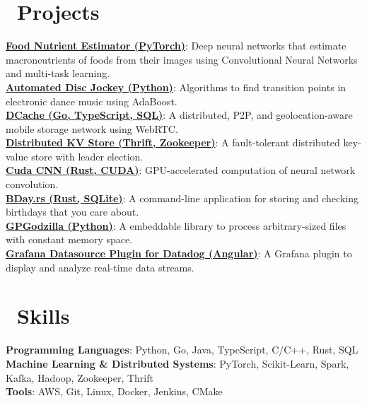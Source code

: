 \documentclass{resume}
\begin{document}
\section{\faCodeFork\ Projects}
 {

  \fontsize{10.5pt}{1.25}\selectfont
  \href{https://github.com/yirzhou/11785-Nutrient-Estimation}{\textbf{Food Nutrient Estimator (PyTorch)}}: Deep neural networks that estimate macroneutrients of foods from their images using Convolutional Neural Networks and multi-task learning. \\
  \href{https://github.com/pythonicmux/automated-dj-mlsp/tree/yirzhou}{\textbf{Automated Disc Jockey (Python)}}: Algorithms to find transition points in electronic dance music using AdaBoost. \\
  \href{https://drive.google.com/file/d/1Svd-wbXZiO84QmVKnKBp1cClJb2uvtWT/view?usp=sharing}{\textbf{DCache (Go, TypeScript, SQL)}}: A distributed, P2P, and geolocation-aware mobile storage network using WebRTC. \\
  \href{https://github.com/yirzhou/KVStore}{\textbf{Distributed KV Store (Thrift, Zookeeper)}}: A fault-tolerant distributed key-value store with leader election. \\
  \href{https://github.com/yirzhou/CudaCNN}{\textbf{Cuda CNN (Rust, CUDA)}}: GPU-accelerated computation of neural network convolution. \\
  \href{https://github.com/yirzhou/IsolatedSoul/tree/main/rsbday}{\textbf{BDay.rs (Rust, SQLite)}}: A command-line application for storing and checking birthdays that you care about. \\
  \href{https://pypi.org/project/gpgodzilla/}{\textbf{GPGodzilla (Python)}}: A embeddable library to process arbitrary-sized files with constant memory space. \\
  \href{https://github.com/Enflick/grafana-datasource-datadog/pull/7}{\textbf{Grafana Datasource Plugin for Datadog (Angular)}}: A Grafana plugin to display and analyze real-time data streams. \\
  \par
 }

\section{\faCogs\ Skills}
 {
  \fontsize{10.5pt}{2}\selectfont
  \onehalfspacing
  \textbf{Programming Languages}: Python, Go, Java, TypeScript, C/C++, Rust, SQL \\
  \textbf{Machine Learning \& Distributed Systems}: PyTorch, Scikit-Learn, Spark, Kafka, Hadoop, Zookeeper, Thrift \\
  \textbf{Tools}: AWS, Git, Linux, Docker, Jenkins, CMake
  \par
 }



%
%
\end{document}
